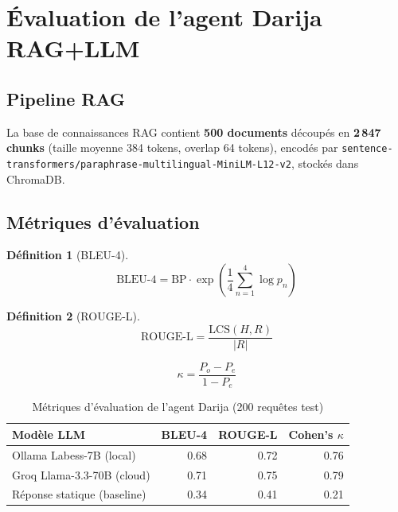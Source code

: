 \documentclass[12pt,a4paper,twoside]{report}
\newtheorem{definition}{Définition}[chapter]
\newcommand{\code}[1]{\texttt{#1}}
\begin{document}
\section{Évaluation de l'agent Darija RAG+LLM}
\label{sec:eval_darija}

\subsection{Pipeline RAG}

La base de connaissances RAG contient \textbf{500 documents}
découpés en \textbf{2\,847 chunks} (taille moyenne 384 tokens, overlap 64 tokens),
encodés par \code{sentence-transformers/paraphrase-multilingual-MiniLM-L12-v2},
stockés dans ChromaDB.

\subsection{Métriques d'évaluation}

\begin{definition}[BLEU-4]
\begin{equation}
\text{BLEU-4} = \text{BP} \cdot \exp\left(\frac{1}{4}\sum_{n=1}^{4}\log p_n\right)
\label{eq:bleu}
\end{equation}
\end{definition}

\begin{definition}[ROUGE-L]
\begin{equation}
\text{ROUGE-L} = \frac{\text{LCS}(H, R)}{|R|}
\label{eq:rouge}
\end{equation}
\end{definition}

\begin{equation}
\kappa = \frac{P_o - P_e}{1 - P_e}
\label{eq:kappa}
\end{equation}

\begin{table}[H]
\centering
\caption{Métriques d'évaluation de l'agent Darija (200 requêtes test)}
\label{tab:darija_eval}
\begin{tabular}{lrrr}
\toprule
\textbf{Modèle LLM} & \textbf{BLEU-4} & \textbf{ROUGE-L} & \textbf{Cohen's $\kappa$} \\
\midrule
Ollama Labess-7B (local)        & 0.68 & 0.72 & 0.76 \\
Groq Llama-3.3-70B (cloud)      & 0.71 & 0.75 & 0.79 \\
Réponse statique (baseline)     & 0.34 & 0.41 & 0.21 \\
\bottomrule
\end{tabular}
\end{table}
\end{document}
